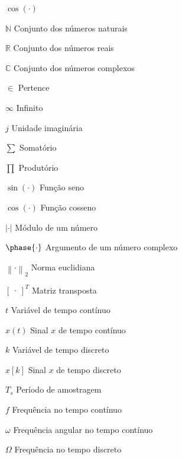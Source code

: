\documentclass[repeatfields,oneside,overleaf]{tcc}
\begin{document}
\begin{listofsymbols}{$ \cos(\cdot) $}



    \item[$ \mathbb{N} $] Conjunto dos números naturais
    \item[$ \mathbb{R} $] Conjunto dos números reais
    \item[$ \mathbb{C} $] Conjunto dos números complexos

    \item[$ \in $] Pertence

    \item[$ \infty $] Infinito
    \item[$ j $] Unidade imaginária

    \item[$ \sum $] Somatório
    \item[$ \prod $] Produtório

    \item[$ \sin(\cdot) $] Função seno
    \item[$ \cos(\cdot) $] Função cosseno

    \item[$ \left| \cdot \right| $] Módulo de um número
    \item[$ \phase{\cdot} $] Argumento de um número complexo

    \item[$ \left\lVert \cdot \right\rVert_2 $] Norma euclidiana

    \item[$ \begin{bmatrix} \cdot \end{bmatrix}^T $] Matriz transposta


    \item[$ t $] Variável de tempo contínuo
    \item[$ x(t) $] Sinal $x$ de tempo contínuo

    \item[$ k $] Variável de tempo discreto
    \item[$ x {[k]} $] Sinal $x$ de tempo discreto
    \item[$ T_s $] Período de amostragem

    \item[$ f $] Frequência no tempo contínuo
    \item[$ \omega $] Frequência angular no tempo contínuo
    \item[$ \Omega $] Frequência no tempo discreto



\end{listofsymbols}
\end{document}
